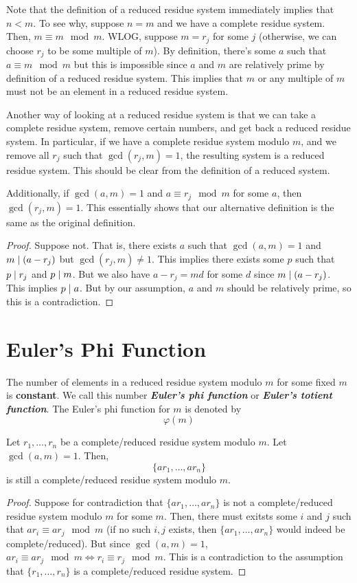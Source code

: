 Note that the definition of a reduced residue system immediately implies that $n < m$. To see why, suppose $n = m$ and we have a complete residue system. Then, $m \equiv m \mod m$. WLOG, suppose $m = r_j$ for some $j$ (otherwise, we can choose $r_j$ to be some multiple of $m$). By definition, there's some $a$ such that $a \equiv m \mod m$ but this is impossible since $a$ and $m$ are relatively prime by definition of a reduced residue system. This implies that $m$ or any multiple of $m$ must not be an element in a reduced residue system.

Another way of looking at a reduced residue system is that we can take a complete residue system, remove certain numbers, and get back a reduced residue system. In particular, if we have a complete residue system modulo $m$, and we remove all $r_j$ such that $\gcd(r_j, m) = 1$, the resulting system is a reduced residue system. This should be clear from the definition of a reduced system.

Additionally, if $\gcd(a,m) = 1$ and $a \equiv r_j \mod m$ for some $a$, then $\gcd(r_j,m) = 1$. This essentially shows that our alternative definition is the same as the original definition.

\begin{proof}
    Suppose not. That is, there exists $a$ such that $\gcd(a,m) = 1$ and $m \mathrel{\mid} (a-r_j)$ but $\gcd(r_j,m) \neq 1$. This implies there exists some $p$ such that $p \mathrel{\mid} r_j$ and $p \mathrel{\mid} m$. But we also have $a - r_j = md$ for some $d$ since $m \mathrel{\mid} (a-r_j)$. This implies $p \mathrel{\mid} a$. But by our assumption, $a$ and $m$ should be relatively prime, so this is a contradiction.
\end{proof}

\section{Euler's Phi Function}

The number of elements in a reduced residue system modulo $m$ for some fixed $m$ is \textbf{constant}. We call this number \textit{\textbf{Euler's phi function}} or \textit{\textbf{Euler's totient function}}. The Euler's phi function for $m$ is denoted by
$$
\varphi(m)
$$

\begin{theorem}
    Let $r_1,\ldots,r_n$ be a complete/reduced residue system modulo $m$. Let $\gcd(a,m)=1$. Then,
    $$
    \{ ar_1,\ldots, ar_n \}
    $$
    is still a complete/reduced residue system modulo $m$.
\end{theorem}

\begin{proof}
    Suppose for contradiction that $\{ar_1,\ldots,ar_n\}$ is not a complete/reduced residue system modulo $m$ for some $m$. Then, there must exitsts some $i$ and $j$ such that $ar_i \equiv ar_j \mod m$ (if no such $i,j$ exists, then $\{ar_1,\ldots,ar_n\}$ would indeed be complete/reduced). But since $\gcd(a,m) = 1$, $ar_i \equiv ar_j \mod m \iff r_i \equiv r_j \mod m$. This is a contradiction to the assumption that $\{r_1,\ldots,r_n\}$ is a complete/reduced residue system.
\end{proof}

